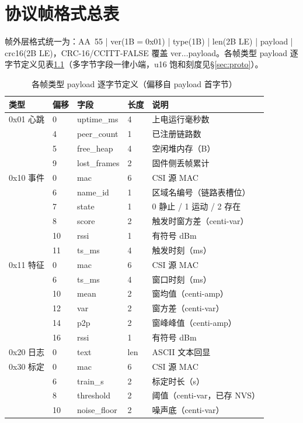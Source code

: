 \chapter{协议帧格式总表}\label{chap:appA}

帧外层格式统一为：AA~55 | ver(1B${}=0$x01) | type(1B) | len(2B LE) | payload | crc16(2B LE)，CRC-16/CCITT-FALSE 覆盖 ver$\ldots$payload。各帧类型 payload 逐字节定义见表\ref{tab:frameA}（多字节字段一律小端，u16 饱和刻度见\S\ref{sec:proto}）。

\begin{table}[htbp]
  \centering
  \caption{各帧类型 payload 逐字节定义（偏移自 payload 首字节）}
  \label{tab:frameA}
  \begin{tabular}{llllp{4.6cm}}
    \toprule
    \textbf{类型} & \textbf{偏移} & \textbf{字段} & \textbf{长度} & \textbf{说明} \\
    \midrule
    0x01 心跳 & 0 & uptime\_ms & 4 & 上电运行毫秒数 \\
     & 4 & peer\_count & 1 & 已注册链路数 \\
     & 5 & free\_heap & 4 & 空闲堆内存（B） \\
     & 9 & lost\_frames & 2 & 固件侧丢帧累计 \\
    \midrule
    0x10 事件 & 0 & mac & 6 & CSI 源 MAC \\
     & 6 & name\_id & 1 & 区域名编号（链路表槽位） \\
     & 7 & state & 1 & 0 静止 / 1 运动 / 2 存在 \\
     & 8 & score & 2 & 触发时窗方差（centi-var） \\
     & 10 & rssi & 1 & 有符号 dBm \\
     & 11 & ts\_ms & 4 & 触发时刻（ms） \\
    \midrule
    0x11 特征 & 0 & mac & 6 & CSI 源 MAC \\
     & 6 & ts\_ms & 4 & 窗口时刻（ms） \\
     & 10 & mean & 2 & 窗均值（centi-amp） \\
     & 12 & var & 2 & 窗方差（centi-var） \\
     & 14 & p2p & 2 & 窗峰峰值（centi-amp） \\
     & 16 & rssi & 1 & 有符号 dBm \\
    \midrule
    0x20 日志 & 0 & text & len & ASCII 文本回显 \\
    \midrule
    0x30 标定 & 0 & mac & 6 & CSI 源 MAC \\
     & 6 & train\_s & 2 & 标定时长（s） \\
     & 8 & threshold & 2 & 阈值（centi-var，已存 NVS） \\
     & 10 & noise\_floor & 2 & 噪声底（centi-var） \\
    \bottomrule
  \end{tabular}
\end{table}

